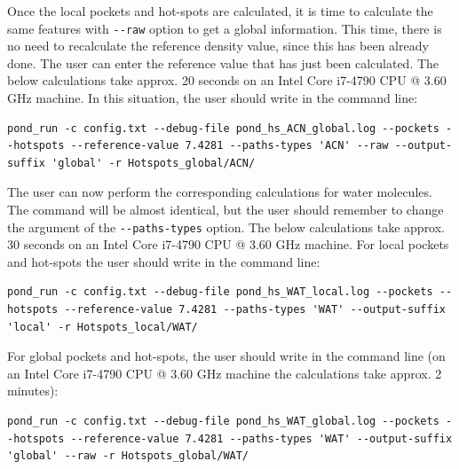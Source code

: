 \documentclass[9pt,tutorial]{livecoms}
\begin{document}
Once the local pockets and hot-spots are calculated, it is time to calculate the same features with \texttt{-{}-raw} option to get a global information. This time, there is no need to recalculate the reference density value, since this has been already done. The user can enter the reference value that has just been calculated. The below calculations take approx. 20 seconds on an Intel Core i7-4790 CPU @ 3.60 GHz machine. In this situation, the user should write in the command line:
\begin{lstlisting}
pond_run -c config.txt --debug-file pond_hs_ACN_global.log --pockets --hotspots --reference-value 7.4281 --paths-types 'ACN' --raw --output-suffix 'global' -r Hotspots_global/ACN/ 
\end{lstlisting}
The user can now perform the corresponding calculations for water molecules. The command will be almost identical, but the user should remember to change the argument of the \texttt{-{}-paths-types} option. The below calculations take approx. 30 seconds on an Intel Core i7-4790 CPU @ 3.60 GHz machine. For local pockets and hot-spots the user should write in the command line:
\begin{lstlisting}
pond_run -c config.txt --debug-file pond_hs_WAT_local.log --pockets --hotspots --reference-value 7.4281 --paths-types 'WAT' --output-suffix 'local' -r Hotspots_local/WAT/ 
\end{lstlisting}
For global pockets and hot-spots, the user should write in the command line (on an Intel Core i7-4790 CPU @ 3.60 GHz machine the calculations take approx. 2 minutes):
\begin{lstlisting}
pond_run -c config.txt --debug-file pond_hs_WAT_global.log --pockets --hotspots --reference-value 7.4281 --paths-types 'WAT' --output-suffix 'global' --raw -r Hotspots_global/WAT/ 
\end{lstlisting}
\end{document}
